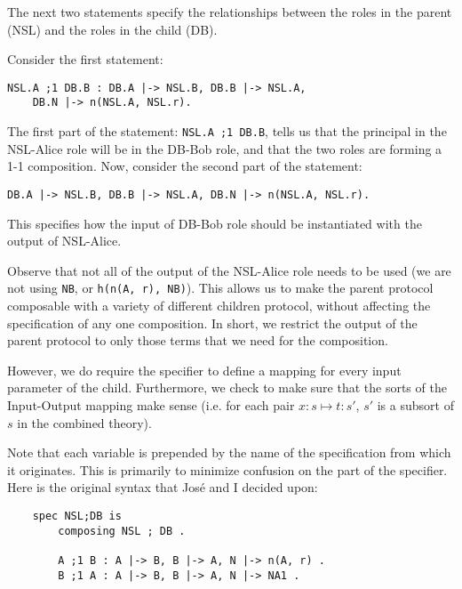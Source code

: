 \documentclass{article}
\begin{document}
The next two statements specify the relationships between the roles in the 
parent (NSL)
and the roles in the child (DB). 

Consider the first statement:
\begin{verbatim}
NSL.A ;1 DB.B : DB.A |-> NSL.B, DB.B |-> NSL.A, 
    DB.N |-> n(NSL.A, NSL.r).
\end{verbatim}

The first part of the statement: \verb#NSL.A ;1 DB.B#, tells us that the 
principal
in the NSL-Alice role will be in the DB-Bob role, and that
the two roles are forming a 1-1 composition. Now, consider the second part of 
the statement:

\begin{verbatim}
DB.A |-> NSL.B, DB.B |-> NSL.A, DB.N |-> n(NSL.A, NSL.r).
\end{verbatim}

This specifies how the
input of DB-Bob role should be instantiated with the output of 
NSL-Alice.

Observe that not all of the output of the NSL-Alice
role needs to be used (we are not using \verb|NB|, or \verb|h(n(A, r), NB)|). 
This allows us to make the parent protocol composable with a variety of 
different children protocol, without affecting the specification of any 
one composition. In short, we restrict the output of the parent protocol to
only those terms that we need for the composition.

However, we do require the specifier to define a mapping for every input 
parameter of the child. 
Furthermore, we check to make sure that the sorts of the Input-Output mapping
make sense (i.e. for each pair $x:s \mapsto t:s'$, 
$s'$ is a subsort of $s$ in the combined theory). 

Note that each variable is prepended by the name of the specification from 
which
it originates. This is primarily to minimize confusion on the part of the 
specifier.
Here is the original syntax that Jos\'{e} and I decided upon:

\begin{verbatim}
    spec NSL;DB is 
        composing NSL ; DB .

        A ;1 B : A |-> B, B |-> A, N |-> n(A, r) .
        B ;1 A : A |-> B, B |-> A, N |-> NA1 . 

\end{verbatim}
\end{document}
